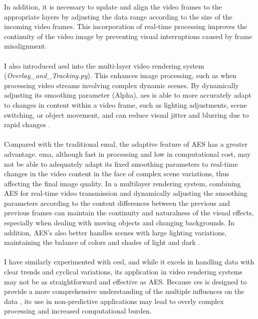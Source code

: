 \documentclass[12pt]{article}
\begin{document}
\begin{enumerate}
\begin{enumerate}
                        In addition, it is necessary to update and align the video frames to the appropriate layers by adjusting the data range according to the size of the incoming video frames. This incorporation of real-time processing improves the continuity of the video image by preventing visual interruptions caused by frame misalignment\cite{Wang}.
                        \\\\
                        I also introduced \gls{aesl} into the multi-layer video rendering system (\emph{Overlay\_and\_Tracking.py}). This enhances image processing, such as when processing video streams involving complex dynamic scenes\cite{7410724}. By dynamically adjusting its smoothing parameter (Alpha), \gls{aes} is able to more accurately adapt to changes in content within a video frame, such as lighting adjustments, scene switching, or object movement, and can reduce visual jitter and blurring due to rapid changes \cite{7410724}.
                        \\\\
                        Compared with the traditional \gls{emal}, the adaptive feature of AES has a greater advantage. \gls{ema}, although fast in processing and low in computational cost, may not be able to adequately adapt its fixed smoothing parameters to real-time changes in the video content in the face of complex scene variations, thus affecting the final image quality\cite{aes,aes2,InvestopediaEMA}.
                        In a multilayer rendering system, combining AES for real-time video transmission and dynamically adjusting the smoothing parameters according to the content differences between the previous and previous frames can maintain the continuity and naturalness of the visual effects, especially when dealing with moving objects and changing backgrounds. In addition, AES's also better handles scenes with large lighting variations, maintaining the balance of colors and shades of light and dark \cite{7298776}.
                        \\\\
                        I have similarly experimented with \gls{cesl}, and while it excels in handling data with clear trends and cyclical variations, its application in video rendering systems may not be as straightforward and effective as AES. Because \gls{ces} is designed to provide a more comprehensive understanding of the multiple influences on the data \cite{ComplexES2018,Complex}, its use in non-predictive applications may lead to overly complex processing and increased computational burden.

\end{enumerate}
\end{enumerate}
\end{document}
